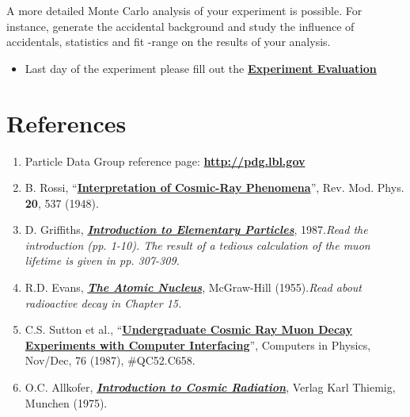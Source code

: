 \documentclass{../lab}
\begin{document}
A more detailed Monte Carlo analysis of your experiment is possible. For instance, generate the accidental background and study the influence of accidentals, statistics and fit -range on the results of your analysis.

\begin{itemize}
    \item Last day of the experiment please fill out the \href{\ExperimentEvaluation}{\textbf{Experiment Evaluation}}

\end{itemize}

\section{References}
\label{sec:References}

\begin{enumerate}
    \item Particle Data Group reference page: \href{http://pdg.lbl.gov}{\textbf{http://pdg.lbl.gov}}

    \item B. Rossi, ``\href{https://drive.google.com/file/d/1tFUQJkkIA-OwbRkS-L1pOJuPoD6z67KY/view?usp=drive_link}{\textbf{Interpretation of Cosmic-Ray Phenomena}}'', Rev. Mod. Phys. \textbf{20}, 537 (1948).

    \item D. Griffiths, \emph{\href{https://drive.google.com/file/d/18XScxxcYNKgADn1AqmlNitSiLdN9WW2b/view?usp=drive_link}{\textbf{Introduction to Elementary Particles}}}, 1987.\emph{Read the introduction (pp. 1-10). The result of a tedious calculation of the muon lifetime is given in pp. 307-309.}

    \item R.D. Evans, \emph{\href{https://drive.google.com/file/d/1ttYuACjCZGCMiR4tlyA9ec0YPbtUQsoy/view?usp=drive_link}{\textbf{The Atomic Nucleus}}}, McGraw-Hill (1955).\emph{Read about radioactive decay in Chapter 15.}

    \item C.S. Sutton et al., ``\href{https://drive.google.com/file/d/13LiC-VXNr-rjJ6sgqPZBUyezSClVRsEr/view?usp=drive_link}{\textbf{Undergraduate Cosmic Ray Muon Decay Experiments with Computer Interfacing}}'', Computers in Physics, Nov/Dec, 76 (1987), \#QC52.C658.

    \item O.C. Allkofer, \emph{\href{https://drive.google.com/file/d/1Ebsxt4--LJtIjk3qoaF1UQJ9aWObm_ok/view?usp=drive_link}{\textbf{Introduction to Cosmic Radiation}}}, Verlag Karl Thiemig, Munchen (1975).


\end{enumerate}
\end{document}
